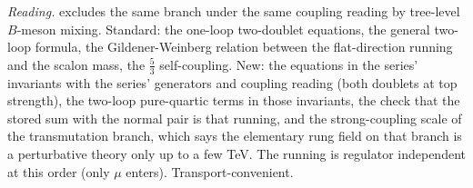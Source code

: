 \emph{Reading.}  excludes the same branch under the same coupling reading by tree-level $B$-meson mixing. Standard: the one-loop two-doublet equations, the general two-loop formula, the Gildener-Weinberg relation between the flat-direction running and the scalon mass, the $\tfrac53$ self-coupling. New: the equations in the series' invariants with the series' generators and coupling reading (both doublets at top strength), the two-loop pure-quartic terms in those invariants, the check that the stored sum with the normal pair is that running, and the strong-coupling scale of the transmutation branch, which says the elementary rung field on that branch is a perturbative theory only up to a few TeV. The running is regulator independent at this order (only $\mu$ enters). Transport-convenient.
